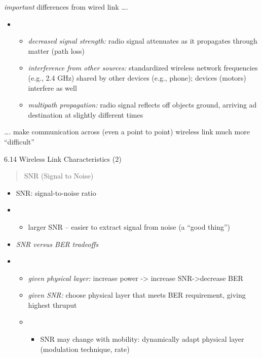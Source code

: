 \documentclass[
]{article}
\begin{document}
\emph{important} differences from wired link \ldots.

\begin{itemize}
\item
  \begin{itemize}
  \item
    \emph{decreased signal strength:} radio signal attenuates as it
    propagates through matter (path loss)
  \item
    \emph{interference from other sources:} standardized wireless
    network frequencies (e.g., 2.4 GHz) shared by other devices (e.g.,
    phone); devices (motors) interfere as well
  \item
    \emph{multipath propagation:} radio signal reflects off objects
    ground, arriving ad destination at slightly different times
  \end{itemize}
\end{itemize}

\ldots. make communication across (even a point to point) wireless link
much more ``difficult''

6.14 Wireless Link Characteristics (2)

\begin{quote}
SNR (Signal to Noise)
\end{quote}

\begin{itemize}
\item
  SNR: signal-to-noise ratio
\item
  \begin{itemize}
  \item
    larger SNR -- easier to extract signal from noise (a ``good thing'')
  \end{itemize}
\item
  \emph{SNR versus BER tradeoffs}
\item
  \begin{itemize}
  \item
    \emph{given physical layer:} increase power -\textgreater{} increase
    SNR-\textgreater decrease BER
  \item
    \emph{given SNR:} choose physical layer that meets BER requirement,
    giving highest thruput
  \item
    \begin{itemize}
    \item
      SNR may change with mobility: dynamically adapt physical layer
      (modulation technique, rate)
    \end{itemize}
  \end{itemize}
\end{itemize}
\end{document}
